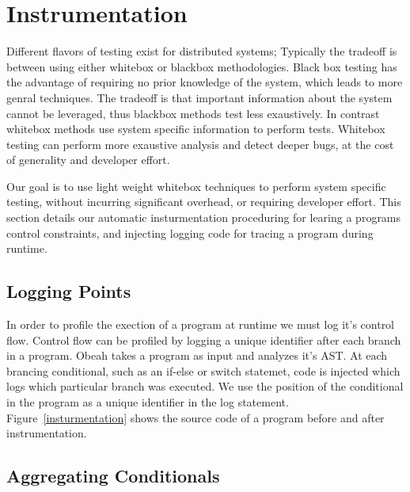 \section{Instrumentation}
\label{sec:instrumentation}



Different flavors of testing exist for distributed systems; Typically the
tradeoff is between using either whitebox or blackbox methodologies. Black box
testing has the advantage of requiring no prior knowledge of the system, which
leads to more genral techniques. The tradeoff is that important information
about the system cannot be leveraged, thus blackbox methods test less
exaustively. In contrast whitebox methods use system specific information to
perform tests. Whitebox testing can perform more exaustive analysis and detect
deeper bugs, at the cost of generality and developer effort. 

Our goal is to use light weight whitebox techniques to perform system specific
testing, without incurring significant overhead, or requiring developer effort.
This section details our automatic insturmentation proceduring for learing a
programs control constraints, and injecting logging code for tracing a program
during runtime.

\subsection{Logging Points}

In order to profile the exection of a program at runtime we must log it's
control flow. Control flow can be profiled by logging a unique identifier after
each branch in a program. Obeah takes a program as input and analyzes it's AST.
At each brancing conditional, such as an if-else or switch statemet, code is
injected which logs which particular branch was executed. We use the position
of the conditional in the program as a unique identifier in the log statement.
Figure~\ref{insturmentation} shows the source code of a program before and
after instrumentation.

\subsection{Aggregating Conditionals}

